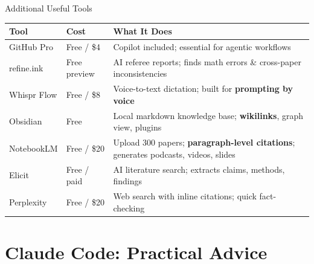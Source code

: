 \documentclass[aspectratio=169, 11pt]{beamer}
\newcommand{\emphgold}[1]{\alert{\textbf{#1}}}
\begin{document}
\begin{frame}{Additional Useful Tools}
\footnotesize
\renewcommand{\arraystretch}{1.4}
\begin{center}
\begin{tabular}{@{} l l p{7cm} @{}}
\toprule
\textbf{Tool} & \textbf{Cost} & \textbf{What It Does} \\
\midrule
GitHub Pro & Free / \$4 & Copilot included; essential for agentic workflows \\
refine.ink & Free preview & AI referee reports; finds math errors \& cross-paper inconsistencies \\
Whispr Flow & Free / \$8 & Voice-to-text dictation; built for \emphgold{prompting by voice} \\
Obsidian & Free & Local markdown knowledge base; \emphgold{wikilinks}, graph view, plugins \\
NotebookLM & Free / \$20 & Upload 300 papers; \emphgold{paragraph-level citations}; generates podcasts, videos, slides \\
Elicit & Free / paid & AI literature search; extracts claims, methods, findings \\
Perplexity & Free / \$20 & Web search with inline citations; quick fact-checking \\
\bottomrule
\end{tabular}
\end{center}
\renewcommand{\arraystretch}{1.0}
\end{frame}

\section{Claude Code: Practical Advice}
\end{document}
